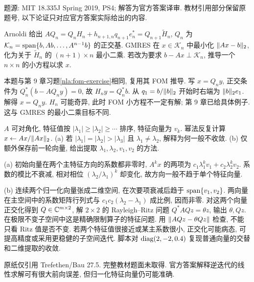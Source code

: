 题源: MIT 18.335J Spring 2019, PS4; 解答为官方答案译审. 教材引用部分保留原题号, 以下论证只对应官方答案实际给出的内容.
\begin{exercise}\label{ps4:q1}
Arnoldi 给出 $AQ_n=Q_nH_n+h_{n+1,n}q_{n+1}e_n^*=Q_{n+1}\widetilde H_n$, $Q_n$ 为 $\mathcal K_n=\operatorname{span}\{b,Ab,\ldots,A^{n-1}b\}$ 的正交基. GMRES 在 $x\in\mathcal K_n$ 中最小化 $\lVert Ax-b\rVert_2$, 化为关于 $\widetilde H_n$ 的 $(n+1)\times n$ 最小二乘. 若改为要求 $b-Ax\perp\mathcal K_n$, 推导一个 $n\times n$ 的小方程以求 $x$.
\end{exercise}
\begin{solution}
本题与第 9 章习题\ref{nla:fom-exercise}相同, 复用其 FOM 推导. 写 $x=Q_ny$, 正交条件为 $Q_n^*(b-AQ_ny)=0$, 故 $H_ny=Q_n^*b$. 从 $q_1=b/\lVert b\rVert_2$ 开始时右端为 $\lVert b\rVert_2 e_1$. 解得 $x=Q_ny$. $H_n$ 可能奇异, 此时 FOM 小方程不一定有解; 第 9 章已给具体例子. 这与 GMRES 的最小二乘目标不同.
\end{solution}
\begin{exercise}\label{ps4:q2}
$A$ 可对角化, 特征值按 $|\lambda_1|\ge|\lambda_2|\ge\cdots$ 排序, 特征向量为 $v_k$. 幂法反复计算 $x\leftarrow Ax/\lVert Ax\rVert_2$.
(a) 若 $|\lambda_1|=|\lambda_2|>|\lambda_3|$ 且 $\lambda_1\ne\lambda_2$, 解释为何一般不收敛.
(b) 仅额外保存前一轮向量, 给出提取 $\lambda_1,\lambda_2,v_1,v_2$ 的方法.
\end{exercise}
\begin{solution}
(a) 初始向量在两个主特征方向的系数都非零时, $A^kx$ 的两项为 $c_1\lambda_1^kv_1+c_2\lambda_2^kv_2$. 系数的模比不衰减, 相对相位 $(\lambda_2/\lambda_1)^k$ 却变化, 故方向一般不趋于单个特征向量.

(b)\label{sol:two-power} 连续两个归一化向量张成二维空间, 在次要项衰减后趋于 $\operatorname{span}\{v_1,v_2\}$. 两向量在主空间中的系数矩阵行列式与 $c_1c_2(\lambda_2-\lambda_1)$ 成比例, 因而非零. 对这两个向量正交化得到 $Q\in\mathbb C^{m\times2}$, 解 $2\times2$ 的 Rayleigh--Ritz 问题 $Q^*AQz=\theta z$, 输出 $\theta,Qz$. 在极限不变子空间中这是精确限制算子的特征问题. 用 $\lVert AQz-\theta Qz\rVert$ 检查, 不能只看 Ritz 值是否不变. 若两个特征值很接近或某主系数很小, 正交化可能病态, 可提高精度或采用更稳健的子空间迭代. 脚本对 $\operatorname{diag}(2,-2,0.4)$ 复现普通向量的交替和二维提取的收敛.
\end{solution}
\begin{exercise}\label{ps4:q3}
原纸仅引用 Trefethen/Bau 27.5. 完整教材题面未取得. 官方答案解释逆迭代的线性求解可有很大前向误差, 但归一化特征向量仍可能准确.
\end{exercise}
